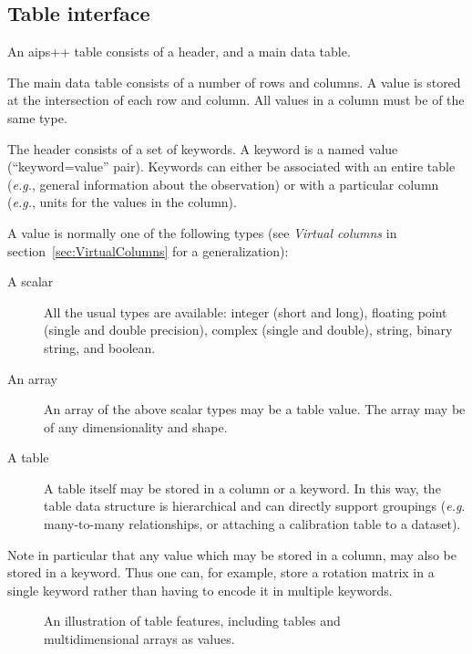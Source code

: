 \subsection{Table interface}

An {\sc aips++} table consists of a header, and a main data table. 

The main data table consists of a number of rows and columns. A value
is stored at the intersection of each row and column. All values in a
column must be of the same type.

The header consists of a set of keywords. A keyword is a named value
(``keyword=value'' pair). Keywords can either be associated with an
entire table ({\em e.g.}, general information about the observation) or
with a particular column ({\em e.g.}, units for the values in the column).

A value is normally one of the following types (see {\em Virtual
columns} in section~\ref{sec:VirtualColumns} for a generalization):
\begin{description}
\item[A scalar]
      All the usual types are available: integer (short and long),
      floating point (single and double precision), complex (single
      and double), string, binary string, and boolean.

\item[An array]
      An array of the above scalar types may be a table value. The
      array may be of any dimensionality and shape.

\item[A table]
      A table itself may be stored in a column or a keyword. In this
      way, the table data structure is hierarchical and can directly
      support groupings ({\em e.g}. many-to-many relationships, or attaching
      a calibration table to a dataset).
\end{description}

Note in particular that any value which may be stored in a column, may
also be stored in a keyword. Thus one can, for example, store a
rotation matrix in a single keyword rather than having to encode it in
multiple keywords.

\begin{figure}
\epsfverbosetrue
\epsfysize=5.0in
\caption{An illustration of table features, including tables and
multidimensional arrays as values.}
\label{fig:dbmanager5}
\end{figure}

